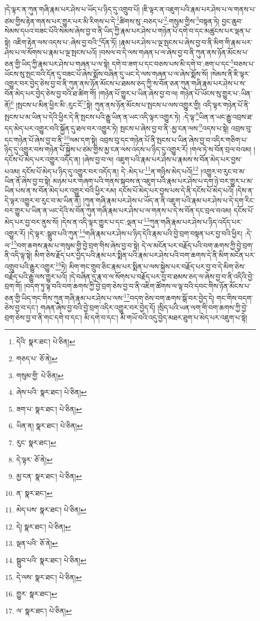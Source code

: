 །དེ་ལྟར་ན་ཀུན་གཞི་རྣམ་པར་ཤེས་པ་ཡོད་པ་ཉིད་དུ་འགྲུབ་པོ། །ཇི་ལྟར་ན་འཇུག་པའི་རྣམ་པར་ཤེས་པ་ལ་གནས་པ་ཙམ་གྱིས་རྟེན་གནས་པར་གྱུར་པར་མི་རིགས་པ་དེ་\footnote{དེའི་  སྣར་ཐང་།  པེ་ཅིན། }ཚིགས་སུ་:བཅད་པ་\footnote{གཅད་པ་  ཅོ་ནེ། }:གསུམ་གྱིས་\footnote{གསུམ་གྱི་  པེ་ཅིན། }བསྟན་ཏེ། བྱང་ཆུབ་སེམས་དཔའ་བཟང་པོའི་སེམས་ཞེས་བྱ་བ་ནི་ཡིད་ཀྱི་རྣམ་པར་ཤེས་པ་གཉེན་པོ་དགེ་བ་དང་མཚུངས་པར་ལྡན་པ་སྟེ། འཇིག་རྟེན་ལས་འདས་པ་:ཞེས་བྱ་བའི་\footnote{ཞེས་པའི་  སྣར་ཐང་།  པེ་ཅིན། }དོན་ཏོ། །རྣམ་པར་ཤེས་པ་ལྔ་སྤངས་པ་ཞེས་བྱ་བ་ནི་མིག་གི་རྣམ་པར་ཤེས་པ་ལ་སོགས་པ་རྣམ་པ་ལྔ་སྤངས་པའོ། །བསལ་བ་དེ་ལས་གཞན་པ་ལ་ཞེས་བྱ་བ་ནི་ཀུན་ནས་ཉོན་མོངས་པ་ཅན་གྱི་ཡིད་ཀྱི་རྣམ་པར་ཤེས་པ་གཞན་པ་ལ་སྟེ། དགེ་བ་ཟག་པ་དང་བཅས་པས་མི་དགེ་བ་:ཟག་པ་དང་\footnote{ཟག་པ་  སྣར་ཐང་།  པེ་ཅིན། }བཅས་པ་ཡོངས་སུ་སྤང་བའི་དོན་དུ་བཟང་པོ་ཞེས་སྨོས་བཞིན་དུ་ཡང་དེ་ལས་གཞན་པ་ལ་ཞེས་སྨོས་སོ། །སེམས་ནི་ཇི་ལྟར་འགྱུར་བར་བྱེད་ཅེས་བྱ་བ་ནི་ཀུན་ནས་ཉོན་མོངས་པ་ཐམས་ཅད་ཀྱི་ས་བོན་ཅན་ཀུན་གཞི་རྣམ་པར་ཤེས་པ་ས་བོན་མེད་པར་བྱེད་ཅེས་བྱ་བའི་ཐ་ཚིག་གོ། །གཉེན་པོ་གྱུར་པ་ཡིན་ཞེས་བྱ་བ་ལ། གཉེན་པོ་ཡོངས་སུ་གྱུར་པ་:ཡིན་ནོ།\footnote{ཡིན་ན།  སྣར་ཐང་།  པེ་ཅིན། } །སྤངས་པ་མིན་ཕྱིར་མི་:རུང་ངོ་\footnote{རུང་  སྣར་ཐང་། }སྟེ། ཀུན་ནས་ཉོན་མོངས་པ་སྤངས་པ་ལས་འགྱུར་གྱི། འདི་ལྟར་གཉེན་པོ་ནི་སྤངས་པ་མ་ཡིན་པ་དེའི་ཕྱིར་དེ་ནི་སྤངས་པའི་རྒྱུ་ཡིན་ན་ཡང་འདི་ལྟར་འགྱུར་ཏེ། :དེ་ལྟ་\footnote{དེ་ལྟར་  ཅོ་ནེ། }ཡིན་ན་ཡང་རྒྱུ་འབྲས་ཐ་དད་མེད་པར་འགྱུར་བའི་སྐྱོན་དུ་ཐལ་བར་འགྱུར་ཏེ། སྤངས་པ་ཞེས་བྱ་བ་ནི་:མྱ་ངན་ལས་\footnote{མྱ་ངན་  སྣར་ཐང་།  པེ་ཅིན། }འདས་པ་སྟེ། འབྲས་བུ་དང་གཉེན་པོ་ཞེས་བྱ་བ་ནི་\footnote{ན་  སྣར་ཐང་། }ལམ་དག་སྟེ། འབྲས་བུ་དང་གཉེན་པོ་ནི་སྤངས་པ་ཡིན་ཞེས་བྱ་བ་འདིར་གཅིག་པ་ཉིད་དུ་འགྱུར་བས་གཉེན་པོ་སྐྱེས་པ་ཙམ་གྱིས་མྱ་ངན་ལས་འདས་པ་ཉིད་དུ་འགྱུར་རོ། །གལ་ཏེ་ས་བོན་བྲལ་བའམ། །དངོས་པོ་མེད་པར་འགྱུར་འདོད་ན། །ཞེས་བྱ་བ་ལ། འཇུག་པའི་རྣམ་པར་ཤེས་པ་རྣམས་ས་བོན་མེད་པར་བྱས་པའམ། དངོས་པོ་མེད་པ་ཉིད་དུ་འགྱུར་བར་འདོད་ན། དེ་:མེད་པ་\footnote{མེད་པས་  སྣར་ཐང་།  པེ་ཅིན། }ན་གཉིས་མེད་པའོ།\footnote{དེ།  སྣར་ཐང་།  པེ་ཅིན། } །འགྱུར་བ་རུང་བ་མ་ཡིན་ནོ་ཞེས་བྱ་བ་སྟེ། མཉམ་པར་གཞག་པའི་གནས་སྐབས་ན་འཇུག་པའི་རྣམ་པར་ཤེས་པ་དག་ཉེ་བར་གྱུར་པ་མ་ཡིན་པས་ན་ས་བོན་མེད་པར་འགྱུར་བའི་ཕྱིར་རམ། དངོས་པོ་མེད་པར་བྱས་པས་དེ་ནི་དངོས་པོ་མེད་པའོ། །དེས་ན་དེ་ལྟར་འགྱུར་བ་རུང་བ་མ་ཡིན་ནོ། །ཀུན་གཞི་རྣམ་པར་ཤེས་པ་ཡོད་ན་ནི་འཇུག་པའི་རྣམ་པར་ཤེས་པ་དེ་དག་རིང་བར་གྱུར་པ་ཡིན་ན་ཡང་དེའི་ས་བོན་ཀུན་གཞི་རྣམ་པར་ཤེས་པ་ལ་གནས་པ་དེ་ས་བོན་དང་བྲལ་བའམ། དངོས་པོ་མེད་པར་བྱ་བར་ནུས་སོ། །དེས་ན་འདི་ལྟར་གྱུར་པ་དང་:ལྡན་པ་\footnote{ལྡན་པའི་  ཅོ་ནེ། }ཀུན་གཞི་རྣམ་པར་ཤེས་པ་ཉིད་འདོད་པར་འགྱུར་རོ། །དེ་ལྟར་:སྒྲུབ་པའི་ཀུན་\footnote{སྒྲུབ་པའི་  སྣར་ཐང་།  པེ་ཅིན། }གཞི་རྣམ་པར་ཤེས་པ་ཉིད་དེའི་རྣམ་པའི་བྱེ་བྲག་བསྟན་པར་བྱ་བའི་ཕྱིར། :དེ་ལ་\footnote{དེ་ལས་  སྣར་ཐང་།  པེ་ཅིན། }བག་ཆགས་རྣམ་པ་གསུམ་གྱི་བྱེ་བྲག་གིས་ཞེས་བྱ་བ་སྟེ། དེ་ལ་མངོན་པར་བརྗོད་པའི་བག་ཆགས་ཀྱི་བྱེ་བྲག་ནི་འདི་ལྟ་སྟེ། མིག་ཅེས་རྗོད་པར་བྱེད་པའི་རྣམ་པར་སྨིན་པའི་རྣམ་པར་ཤེས་པའི་བག་ཆགས་དེ་ནི་མིག་མངོན་པར་འགྲུབ་པའི་རྒྱུར་འགྱུར་\footnote{གྱུར་  སྣར་ཐང་། }ཏེ། མིག་གང་གྲུབ་ཅིང་རྣམ་པར་སྨིན་པ་ལས་སྐྱེས་པར་བརྗོད་པར་བྱ་བ་དེ་མིག་ཅེས་བརྗོད་པའི་རྒྱུ་ལས་གྱུར་པའོ། །དེ་བཞིན་དུ་རྣ་བ་ལ་སོགས་པ་བརྗོད་པར་བྱ་བ་ཐམས་ཅད་ལ་ཞེས་བྱ་བ་ནི་འདིའི་བྱེ་བྲག་གོ། །བདག་ཏུ་ལྟ་བའི་བག་ཆགས་ཀྱི་བྱེ་བྲག་ཅེས་བྱ་བ་ནི་འཇིག་ཚོགས་ལ་ལྟ་བའི་དབང་གིས་ཉོན་མོངས་པ་ཅན་གྱི་ཡིད་གང་གིས་ཀུན་གཞི་རྣམ་པར་ཤེས་པ་ལས་\footnote{ལ་  སྣར་ཐང་།  པེ་ཅིན། }བདག་ཅེས་བག་ཆགས་སྒོ་བར་བྱེད་དེ། གང་གིས་བདག་ཅེས་བྱ་བ་དང་། གཞན་ཞེས་བྱ་བའི་བྱེ་བྲག་འདིར་འགྱུར་བར་བྱེད་དོ། །སྲིད་པའི་ཡན་ལག་གི་བག་ཆགས་ཀྱི་བྱེ་བྲག་ཅེས་བྱ་བ་ནི་གང་དགེ་བ་དང་། མི་དགེ་བ་དང་། མི་གཡོ་བའི་འདུ་བྱེད་མཐར་ཐུག་པ་མེད་པར་འཇུག་པ་སྟེ། 